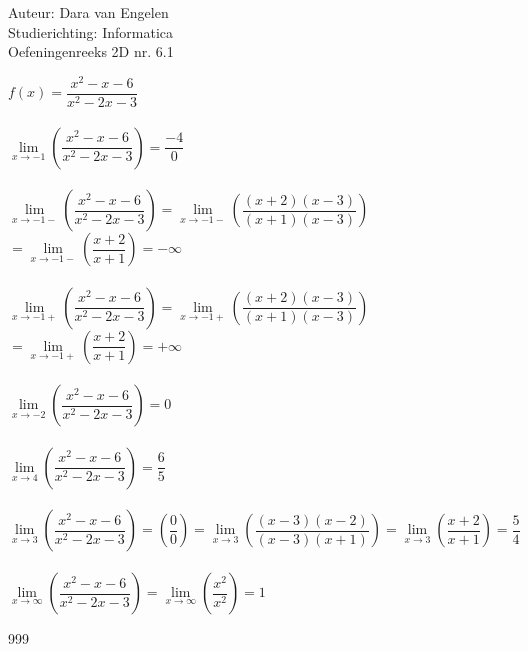 \documentclass[a4paper]{article}
\begin{document}
  
\noindent \large Auteur: Dara van Engelen\\
\noindent \large Studierichting: Informatica\\
\noindent \large Oefeningenreeks 2D nr. 6.1\\

\medskip

\normalsize

$ f(x) = \dfrac{x^2 - x -6}{x^2 -2x-3}$  \\\\

$\lim\limits_{x\rightarrow -1} \left(\dfrac{x^2 - x -6}{x^2 -2x-3}\right) = \dfrac{-4}{0}$\\\\

$\lim\limits_{x\rightarrow -1-} \left(\dfrac{x^2 - x -6}{x^2 -2x-3}\right) = \lim\limits_{x\rightarrow -1-} \left(\dfrac{(x+2)(x-3)}{(x+1)(x-3)}\right)$ \\

$=\lim\limits_{x\rightarrow -1-} \left(\dfrac{x+2}{x+1}\right) =  -\infty$ \\\\

$\lim\limits_{x\rightarrow -1+} \left(\dfrac{x^2 - x -6}{x^2 -2x-3}\right) = \lim\limits_{x\rightarrow -1+} \left(\dfrac{(x+2)(x-3)}{(x+1)(x-3)}\right)$ \\

$=\lim\limits_{x\rightarrow -1+} \left(\dfrac{x+2}{x+1}\right) = +\infty$ \\\\

$\lim\limits_{x\rightarrow -2} \left(\dfrac{x^2 - x -6}{x^2 -2x-3}\right) = 0$ \\\\

$\lim\limits_{x\rightarrow 4} \left(\dfrac{x^2 - x -6}{x^2 -2x-3}\right) = \dfrac{6}{5}$ \\\\

$\lim\limits_{x\rightarrow 3} \left(\dfrac{x^2 - x -6}{x^2 -2x-3}\right) = \left(\dfrac{0}{0}\right) = \lim\limits_{x\rightarrow 3} \left(\dfrac{(x-3)(x-2)}{(x-3)(x+1)}\right) = \lim\limits_{x\rightarrow 3} \left(\dfrac{x+2}{x+1}\right) = \dfrac{5}{4}$ \\\\

$\lim\limits_{x\rightarrow \infty} \left(\dfrac{x^2 - x -6}{x^2 -2x-3}\right) = \lim\limits_{x\rightarrow \infty}\left(\dfrac{x^2}{x^2}\right) = 1$ \\

\begin{thebibliography}{999}
\end{thebibliography}
\end{document}
